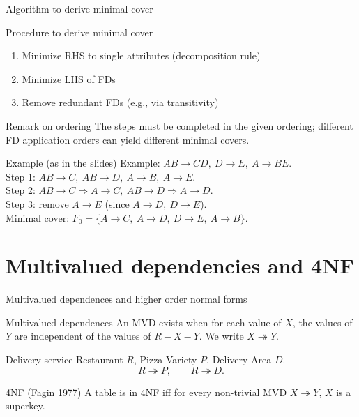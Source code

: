 \documentclass[10pt,aspectratio=169]{beamer}
\newenvironment{examplebox}[1][Example]{\begin{exampleblock}{#1}}{\end{exampleblock}}
\newcommand{\mvd}{\twoheadrightarrow}
\begin{document}
\begin{frame}{Algorithm to derive minimal cover}
\begin{block}{Procedure to derive minimal cover}
\begin{enumerate}
  \item Minimize RHS to single attributes (decomposition rule)
  \item Minimize LHS of FDs
  \item Remove redundant FDs (e.g., via transitivity)
\end{enumerate}
\end{block}

\begin{alertblock}{Remark on ordering}
The steps must be completed in the given ordering; different FD application orders can yield different minimal covers.
\end{alertblock}

\begin{examplebox}[Example (as in the slides)]
Example: \(AB \rightarrow CD,\ D\rightarrow E,\ A \rightarrow BE\).\\
Step 1: \(AB \rightarrow C,\ AB \rightarrow D,\ A \rightarrow B,\ A \rightarrow E\).\\
Step 2: \(AB \rightarrow C \Rightarrow A \rightarrow C,\ AB \rightarrow D \Rightarrow A \rightarrow D\).\\
Step 3: remove \(A \rightarrow E\) (since \(A \rightarrow D,\ D\rightarrow E\)).\\
Minimal cover: \(F_0=\{A \rightarrow C,\ A\rightarrow D,\ D\rightarrow E,\ A\rightarrow B\}\).
\end{examplebox}
\end{frame}

\section{Multivalued dependencies and 4NF}

\begin{frame}{Multivalued dependences and higher order normal forms}
\begin{block}{Multivalued dependences}
An MVD exists when for each value of \(X\), the values of \(Y\) are independent of the values of \(R-X-Y\).
We write \(X \mvd Y\).
\end{block}

\begin{examplebox}[Delivery service]
Restaurant \(R\), Pizza Variety \(P\), Delivery Area \(D\).\\
\[
R \mvd P,\qquad R \mvd D.
\]
\end{examplebox}

\begin{block}{4NF (Fagin 1977)}
A table is in 4NF iff for every non-trivial MVD \(X \mvd Y\), \(X\) is a superkey.
\end{block}
\end{frame}
\end{document}
